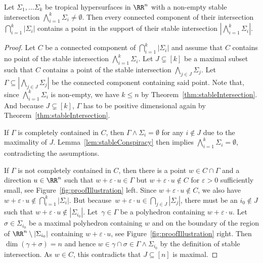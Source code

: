 \begin{theorem}\label{thm:main}
  Let $\Sigma_1,\dots\Sigma_k$ be tropical hypersurfaces in $\RR^n$ with a non-empty stable intersection $\bigwedge_{i=1}^k\Sigma_i\neq\emptyset$. Then every connected component of their intersection $\bigcap_{i=1}^k|\Sigma_i|$ contains a point in the support of their stable intersection $|\bigwedge_{i=1}^k\Sigma_i|$.
\end{theorem}
\begin{proof}
  Let $C$ be a connected component of $\bigcap_{i=1}^k|\Sigma_i|$ and assume that $C$ contains no point of the stable intersection $\bigwedge_{i=1}^k\Sigma_i$.
  Let $J\subsetneq [k]$ be a maximal subset such that $C$ contains a point of the stable intersection $\bigwedge_{j\in J}\Sigma_j$.
  Let $\Gamma\subseteq|\bigwedge_{j\in J}\Sigma_j|$ be the connected component containing said point. Note that, since $\bigwedge_{i=1}^k\Sigma_i$ is non-empty, we have $k\leq n$ by Theorem~\ref{thm:stableIntersection}.  And because $J\subsetneq [k]$, $\Gamma$ has to be positive dimensional again by Theorem~\ref{thm:stableIntersection}.

  If $\Gamma$ is completely contained in $C$, then $\Gamma\wedge\Sigma_i=\emptyset$ for any $i\notin J$ due to the maximality of $J$. Lemma~\ref{lem:stableConspiracy} then implies $\bigwedge_{i=1}^k \Sigma_i=\emptyset$, contradicting the assumptions.

  If $\Gamma$ is not completely contained in $C$, then there is a point $w\in C\cap\Gamma$ and a direction $u\in\RR^n$ such that $w+\varepsilon\cdot u\in\Gamma$ but $w+\varepsilon\cdot u\notin C$ for $\varepsilon>0$ sufficiently small, see Figure~\ref{fig:proofIllustration} left. Since $w+\varepsilon\cdot u\notin C$, we also have $w+\varepsilon\cdot u\notin\bigcap_{i=1}^k|\Sigma_i|$. But because~$w+\varepsilon\cdot u\in \bigcap_{j\in J}|\Sigma_j|$, there must be an $i_0\notin J$ such that $w+\varepsilon\cdot u\notin|\Sigma_{i_0}|$. Let~$\gamma\in\Gamma$ be a polyhedron containing $w+\varepsilon\cdot u$. Let~$\sigma\in\Sigma_{i_0}$ be a maximal polyhedron containing $w$ and on the boundary of the region of $\RR^n\setminus|\Sigma_{i_0}|$ containing $w+\varepsilon\cdot u$, see Figure~\ref{fig:proofIllustration} right. Then  $\dim(\gamma+\sigma)=n$ and hence $w\in\gamma\cap\sigma\in\Gamma\wedge\Sigma_{i_0}$ by the definition of stable intersection. As $w\in C$, this contradicts that $J\subseteq[n]$ is maximal.
\end{proof}
